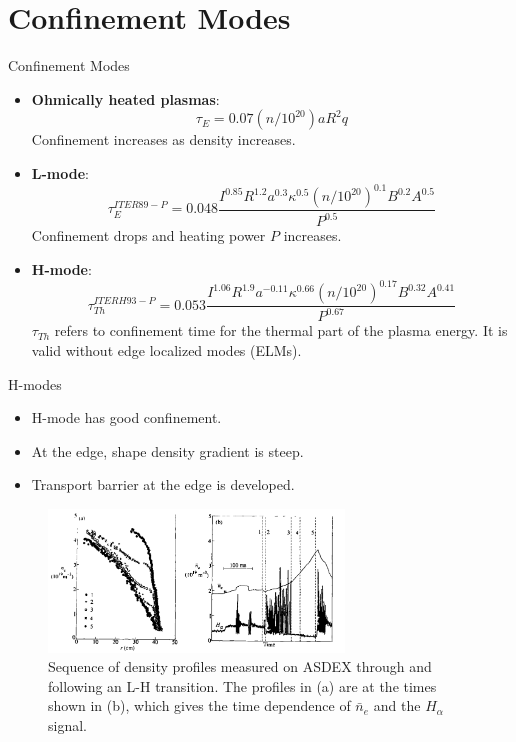\section{Confinement Modes}
\begin{frame} {Confinement Modes}
    \begin{itemize}
        \item \textbf{Ohmically heated plasmas}:
              \[ \tau_E = 0.07(n/10^{20})aR^2q\]
              Confinement increases as density increases.
        \item \textbf{L-mode}:
              \[ \tau_E^{ITER89-P} = 0.048\frac{I^{0.85}R^{1.2}a^{0.3}\kappa^{0.5}(n/10^{20})^{0.1}B^{0.2}A^{0.5}}{P^{0.5}} \]
              Confinement drops and heating power $P$ increases.
        \item \textbf{H-mode}:
              \[ \tau_{Th}^{ITER H93-P} = 0.053\frac{I^{1.06}R^{1.9}a^{-0.11}\kappa^{0.66}(n/10^{20})^{0.17}B^{0.32}A^{0.41}}{P^{0.67}} \]
              $\tau_{Th}$ refers to confinement time for the thermal part of the plasma energy. It is valid without edge localized modes (ELMs).
    \end{itemize}
\end{frame}

\begin{frame} {H-modes}
    \begin{itemize}
        \item H-mode has good confinement.
        \item At the edge, shape density gradient is steep.
        \item Transport barrier at the edge is developed.
    \end{itemize}
    \begin{figure}
        \centering
        \includegraphics[width=0.7\textwidth]{figures/h-mode.png}
        \caption{Sequence of density profiles measured on ASDEX through and following an L-H transition. The profiles in (a) are at the times shown in (b), which gives the time dependence of $\bar{n}_e$ and the $H_\alpha$ signal.}
        \label{fig:h-mode}
    \end{figure}
\end{frame}

